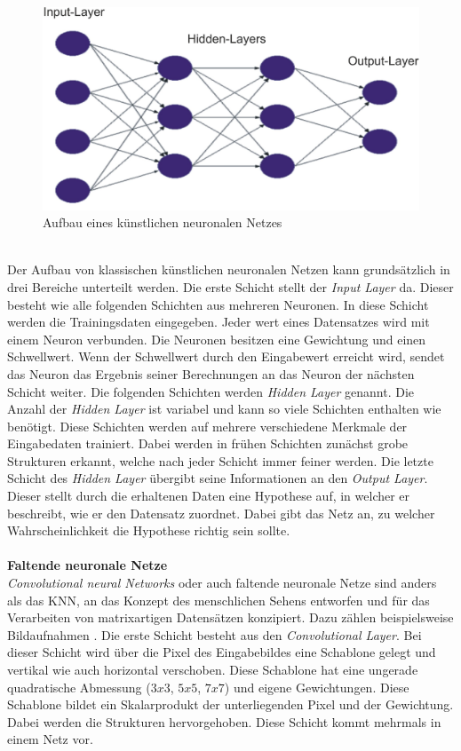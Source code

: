 \documentclass[a4paper,12pt,oneside]{article}
\begin{document}
\begin{figure}
	[h]
	\centering
	\includegraphics[scale=0.5]{Sources/nnet.png}
	\caption{Aufbau eines künstlichen neuronalen Netzes \cite{bistra2018pic}}
	\label{img:neuronales_netz}
\end{figure}\\
Der Aufbau von klassischen künstlichen neuronalen Netzen kann grundsätzlich in drei Bereiche unterteilt werden. Die erste Schicht stellt der \textit{Input Layer} da. Dieser besteht wie alle folgenden Schichten aus mehreren Neuronen. In diese Schicht werden die Trainingsdaten eingegeben. Jeder wert eines Datensatzes wird mit einem Neuron verbunden. Die Neuronen besitzen eine Gewichtung und einen Schwellwert. Wenn der Schwellwert durch den Eingabewert erreicht wird, sendet das Neuron das Ergebnis seiner Berechnungen an das Neuron der nächsten Schicht weiter. Die folgenden Schichten werden \textit{Hidden Layer} genannt. Die Anzahl der \textit{Hidden Layer} ist variabel und kann so viele Schichten enthalten wie benötigt. Diese Schichten werden auf mehrere verschiedene Merkmale der Eingabedaten trainiert. Dabei werden in frühen Schichten zunächst grobe Strukturen erkannt, welche nach jeder Schicht immer feiner werden. Die letzte Schicht des \textit{Hidden Layer} übergibt seine Informationen an den \textit{Output Layer}. Dieser stellt durch die erhaltenen Daten eine Hypothese auf, in welcher er beschreibt, wie er den Datensatz zuordnet. Dabei gibt das Netz an, zu welcher Wahrscheinlichkeit die Hypothese richtig sein sollte.\\\\
\textbf{Faltende neuronale Netze}\label{s.cnn}\\
\textit{Convolutional neural Networks} oder auch faltende neuronale Netze sind anders als das KNN, an das Konzept des menschlichen Sehens entworfen \cite{sermanet2012convolutional} und für das Verarbeiten von matrixartigen Datensätzen konzipiert. Dazu zählen beispielsweise Bildaufnahmen \cite{goodfellow2016deep}. Die erste Schicht besteht aus den \textit{Convolutional Layer}. Bei dieser Schicht wird über die Pixel des Eingabebildes eine Schablone gelegt und vertikal wie auch horizontal verschoben. Diese Schablone hat eine ungerade quadratische Abmessung ($3x3$, $5x5$, $7x7$) und eigene Gewichtungen. Diese Schablone bildet ein Skalarprodukt der unterliegenden Pixel und der Gewichtung. Dabei werden die Strukturen hervorgehoben. Diese Schicht kommt mehrmals in einem Netz vor.\\ 
\end{document}
